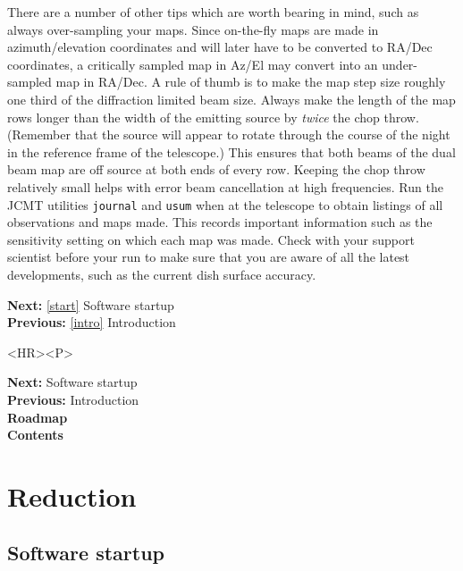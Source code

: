 \documentclass[11pt]{article}
\newenvironment{latexonly}{}{}
\newcommand{\htmlref}[2]{#1}
\newcommand{\xlabel}[1]{}
\begin{document}
   There are a number of other tips which are worth bearing in mind,
   such as always over-sampling your maps. Since on-the-fly maps are
   made in azimuth/elevation coordinates and will later have to be
   converted to RA/Dec coordinates, a critically sampled map in
   Az/El may convert into an under-sampled map in RA/Dec. A
   rule of thumb is to make the map step size roughly one third of the
   diffraction limited beam size. Always make the length of the map rows
   longer than the width of the emitting source by {\em twice\/} the chop
   throw. (Remember that the source will appear to rotate through the
   course of the night in the reference frame of the telescope.) This
   ensures that both beams of the dual beam map are off source at both
   ends of every row. Keeping the chop throw relatively small helps with
\htmlref{error beam}{glosserrorbeam}
   cancellation at high frequencies. Run the JCMT utilities
   {\tt journal} and
   {\tt usum} when at the telescope to obtain listings of all observations
   and maps made. This records important information such as the
\htmlref{sensitivity setting}{glosssensset}
   on which each map was made. Check with your support scientist before
   your run to make sure that you are aware of all the latest
   developments, such as the current dish surface accuracy.

\begin{latexonly}
{\bf Next:} \ref{start} Software startup\\
{\bf Previous:} \ref{intro} Introduction\\
\end{latexonly}

\begin{htmlonly}
\begin{rawhtml} <HR><P> \end{rawhtml}
{\bf \htmlref{Next:}{start}} Software startup\\
{\bf \htmlref{Previous:}{intro}} Introduction\\
{\bf \htmlref{Roadmap}{roadmap}}\\
{\bf \htmlref{Contents}{stardoccontents}}\\
\end{htmlonly}


\newpage
\section{Reduction}

\subsection{\label{start}\xlabel{start}Software startup}
\end{document}
